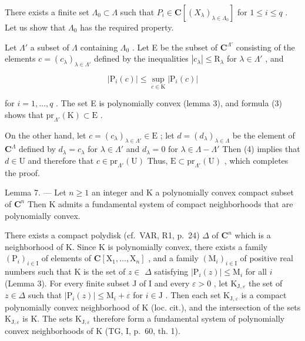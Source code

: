 There exists a finite set \(\Lambda_0 \subset \Lambda\) such that \(P_i \in \mathbf{C}[(X_\lambda)_{\lambda \in \Lambda_0}]\) for \(1 \leqslant i \leqslant q\) . Let us show that \(\Lambda_0\) has the required property.

Let \(\Lambda'\) a subset of \(\Lambda\) containing \(\Lambda_0\) . Let E be the subset of \(\mathbf{C}^{\Lambda'}\) consisting of the elements \(c = (c_{\lambda})_{\lambda \in \Lambda'}\) defined by the inequalities \(|c_{\lambda}| \leqslant \mathrm{R}_{\lambda}\) for \(\lambda \in \Lambda'\) , and

\[
| \mathrm{P} _ {i} (c) | \leqslant \sup _ {c \in \mathrm{K}} | \mathrm{P} _ {i} (c) |
\]

for \(i = 1, \ldots, q\) . The set E is polynomially convex (lemma 3), and formula (3) shows that \(\mathrm{pr}_{\Lambda'}(\mathrm{K}) \subset \mathrm{E}\) .

On the other hand, let \(c = (c_{\lambda})_{\lambda \in \Lambda'} \in \mathrm{E}\) ; let \(d = (d_{\lambda})_{\lambda \in \Lambda}\) be the element of \(\mathbf{C}^{\Lambda}\) defined by \(d_{\lambda} = c_{\lambda}\) for \(\lambda \in \Lambda'\) and \(d_{\lambda} = 0\) for \(\lambda \in \Lambda - \Lambda'\) Then (4) implies that \(d \in \mathrm{U}\) and therefore that \(c \in \mathrm{pr}_{\Lambda'}(\mathrm{U})\) Thus, \(\mathrm{E} \subset \mathrm{pr}_{\Lambda'}(\mathrm{U})\) , which completes the proof.

Lemma 7. --- Let \(n \geqslant 1\) an integer and K a polynomially convex compact subset of \(\mathbf{C}^{n}\) Then K admits a fundamental system of compact neighborhoods that are polynomially convex.

There exists a compact polydisk (cf.~VAR, R1, p.~24) \(\Delta\) of \(\mathbf{C}^n\) which is a neighborhood of K. Since K is polynomially convex, there exists a family \((\mathrm{P}_i)_{i\in \mathrm{I}}\) of elements of \(\mathbf{C}[\mathrm{X}_1,\dots ,\mathrm{X}_n]\) , and a family \((\mathrm{M}_i)_{i\in \mathrm{I}}\) of positive real numbers such that K is the set of \(z\in\) \(\Delta\) satisfying \(|\mathrm{P}_i(z)|\leqslant \mathrm{M}_i\) for all \(i\) (Lemma 3). For every finite subset J of I and every \(\varepsilon >0\) , let \(\mathrm{K}_{\mathrm{J},\varepsilon}\) the set of \(z\in \Delta\) such that \(|\mathrm{P}_i(z)|\leqslant \mathrm{M}_i + \varepsilon\) for \(i\in \mathrm{J}\) . Then each set \(\mathrm{K}_{\mathrm{J},\varepsilon}\) is a compact polynomially convex neighborhood of K (loc. cit.), and the intersection of the sets \(\mathrm{K}_{\mathrm{J},\varepsilon}\) is K. The sets \(\mathrm{K}_{\mathrm{J},\varepsilon}\) therefore form a fundamental system of polynomially convex neighborhoods of K (TG, I, p.~60, th. 1).

